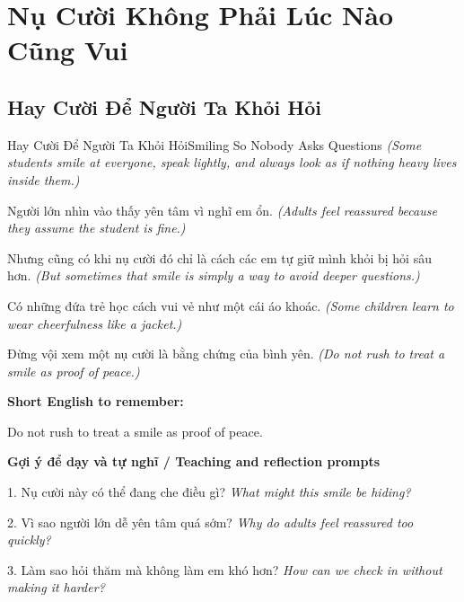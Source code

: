 \chapter{Nụ Cười Không Phải Lúc Nào Cũng Vui}

\section{Hay Cười Để Người Ta Khỏi Hỏi}
\begin{truyen}{Hay Cười Để Người Ta Khỏi Hỏi}{Smiling So Nobody Asks Questions}
\textit{(Some students smile at everyone, speak lightly, and always look as if nothing heavy lives inside them.)}

Người lớn nhìn vào thấy yên tâm vì nghĩ em ổn.
\textit{(Adults feel reassured because they assume the student is fine.)}

Nhưng cũng có khi nụ cười đó chỉ là cách các em tự giữ mình khỏi bị hỏi sâu hơn.
\textit{(But sometimes that smile is simply a way to avoid deeper questions.)}

Có những đứa trẻ học cách vui vẻ như một cái áo khoác.
\textit{(Some children learn to wear cheerfulness like a jacket.)}

\end{truyen}

\begin{baihoc}
Đừng vội xem một nụ cười là bằng chứng của bình yên.
\textit{(Do not rush to treat a smile as proof of peace.)}
\end{baihoc}

\begin{ghinhoanh}
\textbf{Short English to remember:}

Do not rush to treat a smile as proof of peace.

\end{ghinhoanh}

\begin{tuhocnhanh}
\textbf{Gợi ý để dạy và tự nghĩ / Teaching and reflection prompts}

1. Nụ cười này có thể đang che điều gì? \textit{What might this smile be hiding?}

2. Vì sao người lớn dễ yên tâm quá sớm? \textit{Why do adults feel reassured too quickly?}

3. Làm sao hỏi thăm mà không làm em khó hơn? \textit{How can we check in without making it harder?}
\end{tuhocnhanh}
\ngancach

